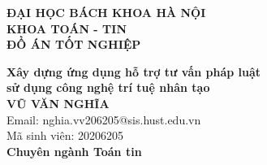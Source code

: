 \begin{titlepage}
\thispagestyle{empty}
\begin{center}

{\textbf{\large{ĐẠI HỌC BÁCH KHOA HÀ NỘI}}}\\
{\textbf{\large{KHOA TOÁN - TIN}}}\\[5cm]

{\textbf{\huge{ĐỒ ÁN TỐT NGHIỆP}}}\\[1cm]
{\textbf{\Large{Xây dựng ứng dụng hỗ trợ tư vấn pháp luật \\ sử dụng công nghệ trí tuệ nhân tạo}}\\[1cm]

{\textbf{\large{VŨ VĂN NGHĨA}}}\\
{\large{Email: nghia.vv206205@sis.hust.edu.vn}}\\
{\large{Mã sinh viên: 20206205}}\\[0.5cm]

{\textbf{\large{Chuyên ngành Toán tin}}}\\

\vspace{4cm}
\begin{table}[H]
\centering
{}
\end{table}}
\end{center}

\end{titlepage}
